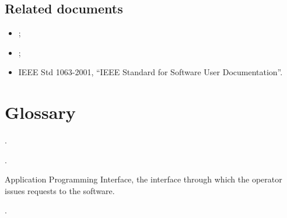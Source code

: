 \documentclass[12pt,a4paper]{extarticle}
\begin{document}
\subsection{Related documents}
\begin{itemize}[leftmargin=1.25cm]
    \item {};
    \item {};
    \item IEEE Std 1063-2001, \enquote{IEEE Standard for Software User Documentation}.
\end{itemize}

\section{Glossary}

\begin{description}[leftmargin=1.25cm,style=nextline]
    \item[\hseFill{term}] .
    \item[\hseFill{term}] .
    \item[API] Application Programming Interface, the interface through which the operator issues requests to the software.
    \item[\hseFill{abbreviation}] .
\end{description}
\end{document}
